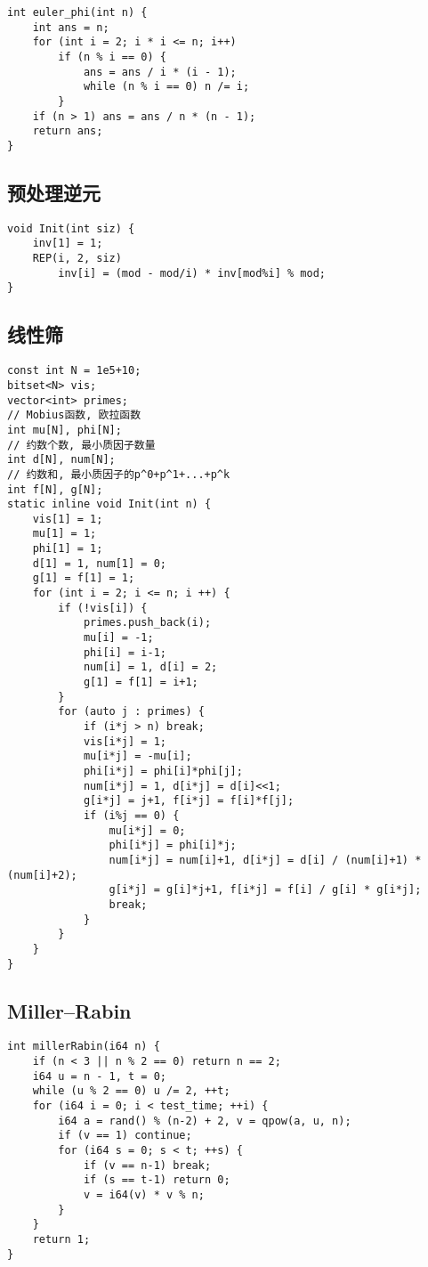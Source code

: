 \documentclass[a4paper,landscape,twocolumn]{ctexart}
\begin{document}
\begin{lstlisting}[]
int euler_phi(int n) {
	int ans = n;
	for (int i = 2; i * i <= n; i++)
		if (n % i == 0) {
			ans = ans / i * (i - 1);
			while (n % i == 0) n /= i;
		}
	if (n > 1) ans = ans / n * (n - 1);
	return ans;
}
\end{lstlisting}

\subsection{预处理逆元}

\begin{lstlisting}[]
void Init(int siz) {
	inv[1] = 1;
	REP(i, 2, siz)
		inv[i] = (mod - mod/i) * inv[mod%i] % mod;
}
\end{lstlisting}

\subsection{线性筛}

\begin{lstlisting}[]
const int N = 1e5+10;
bitset<N> vis;
vector<int> primes;
// Mobius函数, 欧拉函数
int mu[N], phi[N];
// 约数个数, 最小质因子数量
int d[N], num[N];
// 约数和, 最小质因子的p^0+p^1+...+p^k
int f[N], g[N];
static inline void Init(int n) {
	vis[1] = 1;
	mu[1] = 1;
	phi[1] = 1;
	d[1] = 1, num[1] = 0;
	g[1] = f[1] = 1;
	for (int i = 2; i <= n; i ++) {
		if (!vis[i]) {
			primes.push_back(i);
			mu[i] = -1;
			phi[i] = i-1;
			num[i] = 1, d[i] = 2;
			g[1] = f[1] = i+1;
		}
		for (auto j : primes) {
			if (i*j > n) break;
			vis[i*j] = 1;
			mu[i*j] = -mu[i];
			phi[i*j] = phi[i]*phi[j];
			num[i*j] = 1, d[i*j] = d[i]<<1;
			g[i*j] = j+1, f[i*j] = f[i]*f[j];
			if (i%j == 0) {
				mu[i*j] = 0;
				phi[i*j] = phi[i]*j;
				num[i*j] = num[i]+1, d[i*j] = d[i] / (num[i]+1) * (num[i]+2);
				g[i*j] = g[i]*j+1, f[i*j] = f[i] / g[i] * g[i*j];
				break;
			}
		}
	}
}
\end{lstlisting}

\subsection{Miller–Rabin}

\begin{lstlisting}[]
int millerRabin(i64 n) {
	if (n < 3 || n % 2 == 0) return n == 2;
	i64 u = n - 1, t = 0;
	while (u % 2 == 0) u /= 2, ++t;
	for (i64 i = 0; i < test_time; ++i) {
		i64 a = rand() % (n-2) + 2, v = qpow(a, u, n);
		if (v == 1) continue;
		for (i64 s = 0; s < t; ++s) {
			if (v == n-1) break;
			if (s == t-1) return 0;
			v = i64(v) * v % n;
		}
	}
	return 1;
}
\end{lstlisting}
\end{document}
